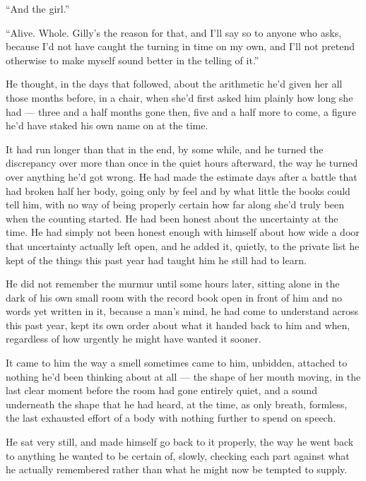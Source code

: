 “And the girl.”

“Alive. Whole. Gilly’s the reason for that, and I’ll say so to anyone who asks, because I’d not have caught the turning in time on my own, and I’ll not pretend otherwise to make myself sound better in the telling of it.”

\sceneBreak

He thought, in the days that followed, about the arithmetic he’d given her all those months before, in a chair, when she’d first asked him plainly how long she had — three and a half months gone then, five and a half more to come, a figure he’d have staked his own name on at the time.

It had run longer than that in the end, by some while, and he turned the discrepancy over more than once in the quiet hours afterward, the way he turned over anything he’d got wrong. He had made the estimate days after a battle that had broken half her body, going only by feel and by what little the books could tell him, with no way of being properly certain how far along she’d truly been when the counting started. He had been honest about the uncertainty at the time. He had simply not been honest enough with himself about how wide a door that uncertainty actually left open, and he added it, quietly, to the private list he kept of the things this past year had taught him he still had to learn.

\sceneBreak

He did not remember the murmur until some hours later, sitting alone in the dark of his own small room with the record book open in front of him and no words yet written in it, because a man’s mind, he had come to understand across this past year, kept its own order about what it handed back to him and when, regardless of how urgently he might have wanted it sooner.

It came to him the way a smell sometimes came to him, unbidden, attached to nothing he’d been thinking about at all — the shape of her mouth moving, in the last clear moment before the room had gone entirely quiet, and a sound underneath the shape that he had heard, at the time, as only breath, formless, the last exhausted effort of a body with nothing further to spend on speech.

He sat very still, and made himself go back to it properly, the way he went back to anything he wanted to be certain of, slowly, checking each part against what he actually remembered rather than what he might now be tempted to supply.

